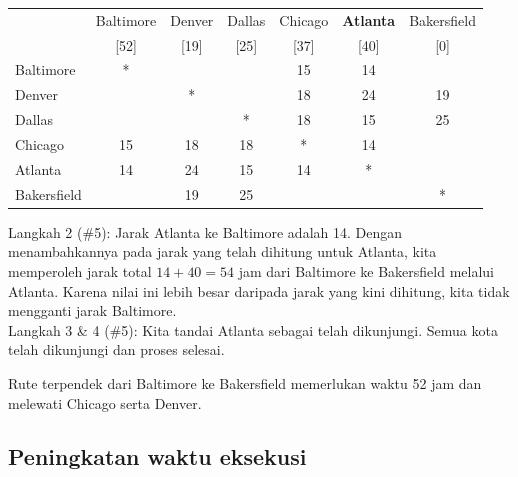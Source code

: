 \begin{example}{}
 \begin{center}
 \begin{tabular}{|l|c|c|c|c|c|c|}
 \hline
 & Baltimore & \cellcolor{yellow}Denver &  \cellcolor{yellow}Dallas &  \cellcolor{yellow}Chicago & \textbf{Atlanta} & \cellcolor{yellow}Bakersfield\\
 &[52]& \cellcolor{yellow}[19]& \cellcolor{yellow}[25]& \cellcolor{yellow}[37]&[40]&\cellcolor{yellow}[0]\\
 \hline
 Baltimore & * & \cellcolor{yellow}& \cellcolor{yellow}& \cellcolor{yellow}15&14&\cellcolor{yellow}\\
 \hline
 \cellcolor{yellow} Denver & \cellcolor{yellow}& \cellcolor{yellow}*& \cellcolor{yellow}& \cellcolor{yellow}18& \cellcolor{yellow}24&\cellcolor{yellow}19\\
 \hline
 \cellcolor{yellow}Dallas& \cellcolor{yellow}& \cellcolor{yellow}& \cellcolor{yellow}*& \cellcolor{yellow}18& \cellcolor{yellow}15&\cellcolor{yellow}25\\
 \hline
  \cellcolor{yellow}Chicago & \cellcolor{yellow}15& \cellcolor{yellow}18& \cellcolor{yellow}18& \cellcolor{yellow}*& \cellcolor{yellow}14&\cellcolor{yellow}\\
 \hline
 Atlanta & 14 &  \cellcolor{yellow}24& \cellcolor{yellow}15& \cellcolor{yellow}14&*&\cellcolor{yellow}\\
 \hline
 \cellcolor{yellow}Bakersfield &\cellcolor{yellow}&\cellcolor{yellow}19&\cellcolor{yellow}25&\cellcolor{yellow}&\cellcolor{yellow}&\cellcolor{yellow}*\\
 \hline
 \end{tabular}
 \end{center}

\noindent Langkah 2 (\#5):  Jarak Atlanta ke Baltimore adalah 14.  Dengan menambahkannya pada jarak yang telah dihitung untuk Atlanta, kita memperoleh jarak total $14+40 = 54$ jam dari Baltimore ke Bakersfield melalui Atlanta.  Karena nilai ini lebih besar daripada jarak yang kini dihitung, kita tidak mengganti jarak Baltimore.\\

\noindent Langkah 3 \& 4 (\#5):  Kita tandai Atlanta sebagai telah dikunjungi.  Semua kota telah dikunjungi dan proses selesai.  

Rute terpendek dari Baltimore ke Bakersfield memerlukan waktu 52 jam dan melewati Chicago serta Denver.
\end{example}

\subsection{Peningkatan waktu eksekusi}

